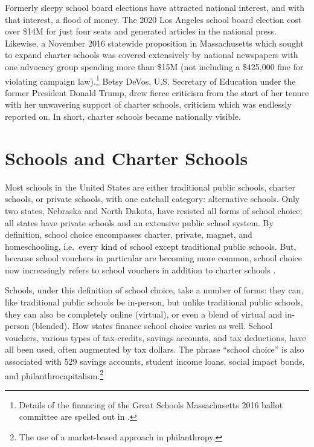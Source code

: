 Formerly sleepy school board elections have attracted national interest, and with that interest, a flood of money. The 2020 Los Angeles school board election cost over \$14M for just four seats and generated articles in the national press. Likewise, a November 2016 statewide proposition in Massachusetts which sought to expand charter schools was covered extensively by national newspapers with one advocacy group spending more than \$15M (not including a \$425,000 fine for violating campaign law).\footnote{Details of the financing of the Great Schools Massachusetts 2016 ballot committee are spelled out in \textcite{Cunningham2021}.} Betsy DeVos, U.S. Secretary of Education under the former President Donald Trump, drew fierce criticism from the start of her tenure with her unwavering support of charter schools, criticism which was endlessly reported on. In short, charter schools became nationally visible. 

\section{Schools and Charter Schools}\indent

Most schools in the United States are either traditional public schools, charter schools, or private schools, with one catchall category: alternative schools.  Only two states, Nebraska and North Dakota, have resisted all forms of school choice; all states have private schools and an extensive public school system. By definition, school choice encompasses charter, private, magnet, and homeschooling, i.e.~every kind of school except traditional public schools. But, because school vouchers in particular are becoming more common, school choice now increasingly refers to school vouchers in addition to charter schools \parencite{Enlow2022}.

Schools, under this definition of school choice, take a number of forms: they can, like traditional public schools be in-person, but unlike traditional public schools, they can also be completely online (virtual), or even a blend of virtual and in-person (blended). How states finance school choice varies as well. School vouchers, various types of tax-credits, savings accounts, and tax deductions, have all been used, often augmented by tax dollars. The phrase ``school choice'' is also associated with 529 savings accounts, student income loans, social impact bonds, and philanthrocapitalism.\footnote{The use of a market-based approach in philanthropy.}

